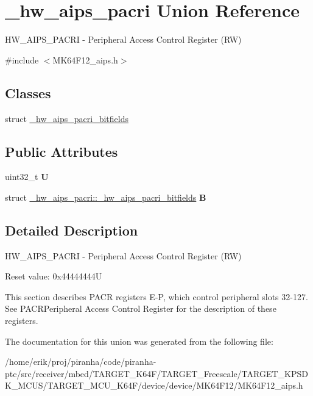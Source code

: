 \hypertarget{union__hw__aips__pacri}{}\section{\+\_\+hw\+\_\+aips\+\_\+pacri Union Reference}
\label{union__hw__aips__pacri}


H\+W\+\_\+\+A\+I\+P\+S\+\_\+\+P\+A\+C\+RI -\/ Peripheral Access Control Register (RW)  




{\ttfamily \#include $<$M\+K64\+F12\+\_\+aips.\+h$>$}

\subsection*{Classes}
\begin{DoxyCompactItemize}
\item 
struct \hyperlink{struct__hw__aips__pacri_1_1__hw__aips__pacri__bitfields}{\+\_\+hw\+\_\+aips\+\_\+pacri\+\_\+bitfields}
\end{DoxyCompactItemize}
\subsection*{Public Attributes}
\begin{DoxyCompactItemize}
\item 
uint32\+\_\+t {\bfseries U}\hypertarget{union__hw__aips__pacri_a891d2ceb6b15460ea4f65821a62a3bf7}{}\label{union__hw__aips__pacri_a891d2ceb6b15460ea4f65821a62a3bf7}

\item 
struct \hyperlink{struct__hw__aips__pacri_1_1__hw__aips__pacri__bitfields}{\+\_\+hw\+\_\+aips\+\_\+pacri\+::\+\_\+hw\+\_\+aips\+\_\+pacri\+\_\+bitfields} {\bfseries B}\hypertarget{union__hw__aips__pacri_a26dc7a07ff6f2d428946ca9fcd8996f4}{}\label{union__hw__aips__pacri_a26dc7a07ff6f2d428946ca9fcd8996f4}

\end{DoxyCompactItemize}


\subsection{Detailed Description}
H\+W\+\_\+\+A\+I\+P\+S\+\_\+\+P\+A\+C\+RI -\/ Peripheral Access Control Register (RW) 

Reset value\+: 0x44444444U

This section describes P\+A\+CR registers E-\/P, which control peripheral slots 32-\/127. See P\+A\+C\+R\+Peripheral Access Control Register for the description of these registers. 

The documentation for this union was generated from the following file\+:\begin{DoxyCompactItemize}
\item 
/home/erik/proj/piranha/code/piranha-\/ptc/src/receiver/mbed/\+T\+A\+R\+G\+E\+T\+\_\+\+K64\+F/\+T\+A\+R\+G\+E\+T\+\_\+\+Freescale/\+T\+A\+R\+G\+E\+T\+\_\+\+K\+P\+S\+D\+K\+\_\+\+M\+C\+U\+S/\+T\+A\+R\+G\+E\+T\+\_\+\+M\+C\+U\+\_\+\+K64\+F/device/device/\+M\+K64\+F12/M\+K64\+F12\+\_\+aips.\+h\end{DoxyCompactItemize}
